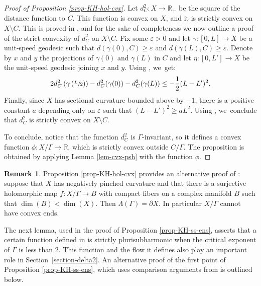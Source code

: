 \documentclass[11pt]{article}
\let\epsilon\varepsilon
\theoremstyle{definition}
\newtheorem*{remark}{Remark}
\newcommand{\R}{\mathbb{R}}
\begin{document}
\begin{proof}[Proof of Proposition \ref{prop-KH-hol-cvx}]
Let $d_C^{2}:X\to \R_+$ be the square of the distance function to $C$. This function is convex on $X$, and it is strictly convex on $X\setminus C$. This is proved in \cite[Lem.\,4.5]{benoistHarmonicQuasiisometricMaps2023}, and for the sake of completeness we now outline a proof of the strict convexity of $d_C^{2}$ on $X\setminus C$. Fix some $\epsilon>0$ and let $\gamma:[0,L]\to X$ be a unit-speed geodesic such that $d(\gamma(0),C)\ge \epsilon$ and $d(\gamma(L),C)\ge \epsilon$. Denote by $x$ and $y$ the projections of $\gamma(0)$ and $\gamma(L)$ in $C$ and let $\eta:[0,L']\to X$ be the unit-speed geodesic joining $x$ and $y$. Using \cite[Cor.\,2.1.3 - Form.\,2.1(iv)]{korevaarSobolevSpacesHarmonic1993}, we~get:
\begin{equation*}
2d_C^{2}\left(\gamma\left(\sfrac{L}{2}\right)\right) - d_C^{2}(\gamma(0)) - d_C^{2}(\gamma(L)) \le -\frac{1}{2}(L-L')^{2}.
\end{equation*}
Finally, since $X$ has sectional curvature bounded above by $-1$, there is a positive constant $a$ depending only on $\epsilon$ such that $(L-L')^{2}\ge aL^{2}$. Using \cite[Lem.\,1]{greeneConvexFunctionsManifolds1976manuel}, we~conclude that $d_C^{2}$ is strictly convex on $X\setminus C$.

To conclude, notice that the function $d_C^{2}$ is $\Gamma$\nobreakdash-invariant, so it defines a convex function $\phi:X/\Gamma\to \R$, which is strictly convex outside $C/\Gamma$. The proposition is obtained by applying Lemma \ref{lem-cvx-psh} with the function $\phi$.
\end{proof}

\begin{remark}
Proposition \ref{prop-KH-hol-cvx} provides an alternative proof of \cite[Prop.\,5]{kapovichSurveyComplexHyperbolic2022}: suppose that $X$ has negatively pinched curvature and that there is a surjective holomorphic map $f:X/\Gamma \to B$ with compact fibers on a complex manifold $B$ such that \hbox{$\dim(B)<\dim(X)$}. Then $\Lambda(\Gamma)=\partial X$. In particular $X/\Gamma$ cannot have convex ends.
\end{remark}

The next lemma, used in the proof of Proposition \ref{prop-KH-ss-ens}, asserts that a certain function defined in \cite{connellNaturalFlowCritical2023} is strictly plurisubharmonic when the critical exponent of $\Gamma$ is less than 2. This function and the flow it defines also play an important role in Section~\ref{section-delta2}. An alternative proof of the first point of Proposition \ref{prop-KH-ss-ens}, which uses comparison arguments from \cite{greeneFunctionTheoryManifolds1979} is outlined below.
\end{document}
